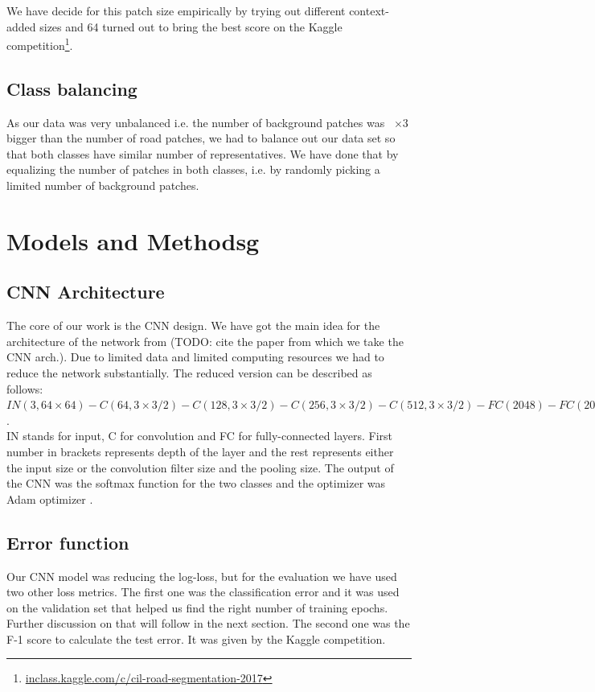\documentclass[10pt,conference,compsocconf]{IEEEtran}
\begin{document}
We have decide for this patch size empirically by trying out different context-added sizes and 64 turned out to bring the
best score on the Kaggle competition\footnote{\url{inclass.kaggle.com/c/cil-road-segmentation-2017}}.

\subsection{Class balancing}
\label{sec:balance}
As our data was very unbalanced i.e. the number of background patches was ~$\times3$ bigger than the number of road patches, 
we had to balance out our data set so that both classes have similar number of representatives. We have done that by 
equalizing the number of patches in both classes, i.e. by randomly picking a limited number of background patches.



\section{Models and Methodsg}
\label{sec:model_and_methods}

\subsection{CNN Architecture}
The core of our work is the CNN design. We have got the main idea for the architecture
of the network from (TODO: cite the paper from which we take the CNN arch.).
Due to limited data and limited computing resources we had to reduce the network substantially. The
reduced version can be described as follows: \\
$IN(3, 64\times64)
-C(64, 3\times3 /2)-C(128, 3\times3 /2)
-C(256, 3\times3 /2)-C(512, 3\times3 /2)
-FC(2048)-FC(2048)-FC(2)$.\\
IN stands for input, C for convolution and FC for fully-connected layers. First number in brackets represents
depth of the layer and the rest represents either the input size or the convolution filter size and the pooling size.
The output of the CNN was the softmax function for the two classes and the optimizer was Adam optimizer \cite{adam}.


\subsection{Error function}
Our CNN model was reducing the log-loss, but for the evaluation we have used two other loss metrics. The first one was
the classification error and it was used on the validation set that helped us find the right number of training epochs. 
Further discussion on that will follow in the next section. The second one was the F-1 score to calculate
the test error. It was given by the Kaggle competition.
\end{document}
